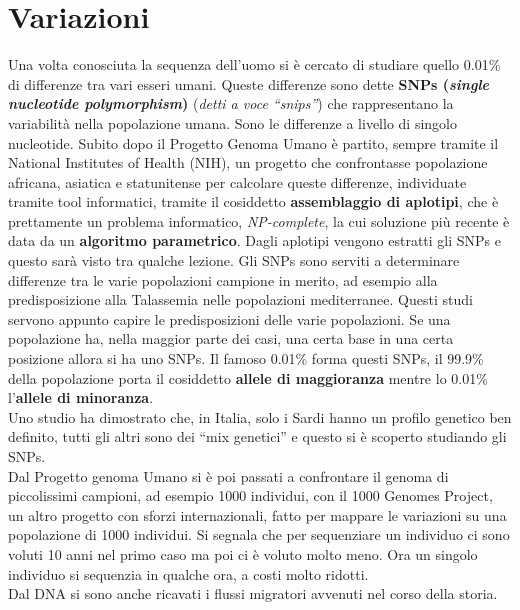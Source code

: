 \documentclass[a4paper,12pt, oneside]{book}
\begin{document}
\section{Variazioni}
Una volta conosciuta la sequenza dell'uomo si è cercato di studiare quello
0.01\% di differenze tra vari esseri umani. Queste differenze sono dette
\textbf{SNPs (\textit{single nucleotide polymorphism})} (\textit{detti a voce
  ``snips''}) che rappresentano la variabilità nella popolazione umana. Sono le
differenze a livello di singolo nucleotide. Subito
dopo il Progetto Genoma Umano è partito, sempre tramite il National Institutes
of Health (NIH), un progetto che confrontasse popolazione africana, asiatica e
statunitense per calcolare queste differenze, individuate tramite tool
informatici, tramite il cosiddetto \textbf{assemblaggio di aplotipi}, che è
prettamente un problema informatico, \textit{NP-complete}, la cui soluzione più
recente è data da un \textbf{algoritmo parametrico}. Dagli aplotipi vengono
estratti gli SNPs e questo sarà visto tra qualche lezione. Gli SNPs sono serviti
a determinare differenze tra le varie popolazioni campione in merito, ad esempio
alla predisposizione alla Talassemia nelle popolazioni mediterranee. Questi
studi servono appunto capire le predisposizioni delle varie popolazioni. Se una
popolazione ha, nella maggior parte dei casi, una certa base in una certa
posizione allora si ha uno SNPs. Il famoso 0.01\% forma questi SNPs, il 99.9\%
della popolazione porta il cosiddetto \textbf{allele di maggioranza} mentre lo
0.01\% l'\textbf{allele di minoranza}.\\
Uno studio ha dimostrato che, in Italia, solo i Sardi hanno un profilo genetico
ben definito, tutti gli altri sono dei ``mix genetici'' e questo si è scoperto
studiando gli SNPs.\\
Dal Progetto genoma Umano si è poi passati a confrontare il genoma di
piccolissimi campioni, ad esempio 1000 individui, con il 1000 Genomes Project,
un altro progetto con sforzi internazionali, fatto per mappare le variazioni su
una popolazione di 1000 individui. Si segnala che per sequenziare un individuo
ci sono voluti 10 anni nel primo caso ma poi ci è voluto molto meno. Ora un
singolo individuo si sequenzia in qualche ora, a costi molto ridotti.\\
Dal DNA si sono anche ricavati i flussi migratori avvenuti nel corso della
storia.
\end{document}

